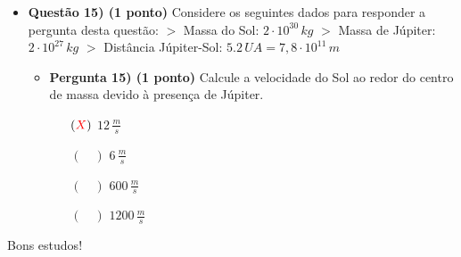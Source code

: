 \documentclass[a4paper, 12pt]{article}
\newcommand{\red}[1]{\textcolor{red}{#1}}
\begin{document}
\begin{flushleft}
\begin{itemize}
            \item \textbf{Questão 15) (1 ponto)} Considere os seguintes dados para responder a pergunta desta questão: \linebreak\linebreak $>$ Massa do Sol: $2 \cdot 10^{30} \, kg$ \linebreak $>$ Massa de Júpiter: $2 \cdot 10^{27} \, kg$ \linebreak $>$ Distância Júpiter-Sol: $5.2 \, UA = 7,8 \cdot 10^{11} \, m$
                \begin{itemize}
                    \item \textbf{Pergunta 15) (1 ponto)} Calcule a velocidade do Sol ao redor do centro de massa devido à presença de Júpiter.
                        \begin{itemize}
                            \item[$(\red{X})$] $12 \, \frac{m}{s}$
                            \item[$(\quad)$] $6 \, \frac{m}{s}$
                            \item[$(\quad)$] $600 \, \frac{m}{s}$
                            \item[$(\quad)$] $1200 \, \frac{m}{s}$
                        \end{itemize}
                \end{itemize}
        \end{itemize} \end{flushleft}

    \begin{flushright}
		\begin{large}
			Bons estudos!
		\end{large}
	\end{flushright}
\end{document}
